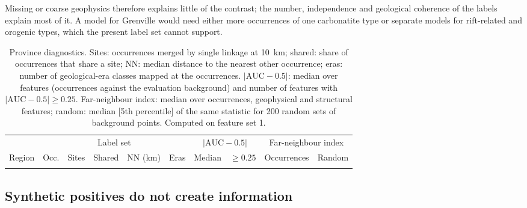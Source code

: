 \documentclass[pdflatex,sn-apa]{sn-jnl}
\begin{document}
Missing or coarse geophysics therefore explains little of the contrast; the number, independence and geological coherence of the labels explain most of it. A model for Grenville would need either more occurrences of one carbonatite type or separate models for rift-related and orogenic types, which the present label set cannot support.

\begin{table}[t]
\caption{Province diagnostics. Sites: occurrences merged by single linkage at 10~km; shared: share of occurrences that share a site; NN: median distance to the nearest other occurrence; eras: number of geological-era classes mapped at the occurrences. $|\mathrm{AUC}-0.5|$: median over features (occurrences against the evaluation background) and number of features with $|\mathrm{AUC}-0.5| \geq 0.25$. Far-neighbour index: median over occurrences, geophysical and structural features; random: median [5th percentile] of the same statistic for 200 random sets of background points. Computed on feature set 1.}\label{tab:region-diag}
\scriptsize
\setlength{\tabcolsep}{2.5pt}
\begin{tabular*}{\textwidth}{@{\extracolsep\fill}lccccccccc}
\toprule
 & \multicolumn{5}{c}{Label set} & \multicolumn{2}{c}{$|\mathrm{AUC}-0.5|$} & \multicolumn{2}{c}{Far-neighbour index} \\
\cmidrule(lr){2-6}\cmidrule(lr){7-8}\cmidrule(lr){9-10}
Region & Occ. & Sites & Shared & NN (km) & Eras & Median & $\geq 0.25$ & Occurrences & Random \\
\midrule
\botrule
\end{tabular*}
\end{table}

\subsection{Synthetic positives do not create information}\label{sec:disc-gan}
\end{document}
